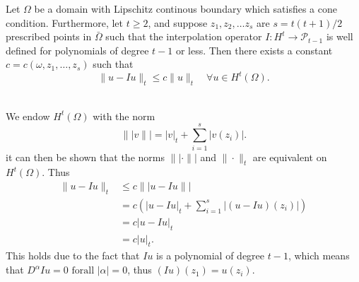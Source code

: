 
\begin{lem}{\quad}
Let $\Omega$ be a domain with Lipschitz continous boundary which satisfies a cone condition. Furthermore, let $t\geq 2$, and suppose $z_1,z_2,\ldots z_s$ are
$s = t(t+1)/2$ prescribed points in $\bar{\Omega}$ such that the interpolation operator $I:H^t \rightarrow \mathcal{P}_{t-1}$ is well defined
for polynomials of degree $t-1$ or less. Then there exists a constant $c=c(\omega,z_1,\ldots,z_s)$ such that
\begin{equation}
    \|u-Iu\|_t\leq c\|u\|_t\quad \forall u\in H^t(\Omega).
    \label{eq:lem_6.2}
\end{equation}~\label{lem:6.2}
\end{lem}

\begin{bev}
    We endow $H^t(\Omega)$ with the norm 
    \begin{equation*}
        \||v\|| = |v|_t + \sum_{i=1}^s |v(z_i)|.
    \end{equation*}
it can then be shown that the norms $\||\cdot\||$ and $\|\cdot\|_t$ are equivalent on $H^t(\Omega)$. Thus
\begin{align*}
    \|u-Iu\|_t&\leq c\||u-Iu\||\\
    &= c(|u-Iu|_t + \sum_{i=1}^s|(u-Iu)(z_i)|)\\
    &= c|u-Iu|_t \\
    &= c|u|_t.
\end{align*}
This holds due to the fact that $Iu$ is a polynomial of degree $t-1$, which means that $D^{\alpha} Iu = 0 \text{ forall } |\alpha|=0$, thus $(Iu)(z_1)=u(z_i)$.


\end{bev}
